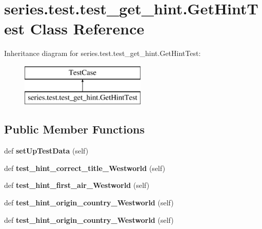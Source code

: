 \hypertarget{classseries_1_1test_1_1test__get__hint_1_1_get_hint_test}{}\section{series.\+test.\+test\+\_\+get\+\_\+hint.\+Get\+Hint\+Test Class Reference}
\label{classseries_1_1test_1_1test__get__hint_1_1_get_hint_test}
Inheritance diagram for series.\+test.\+test\+\_\+get\+\_\+hint.\+Get\+Hint\+Test\+:\begin{figure}[H]
\begin{center}
\leavevmode
\includegraphics[height=2.000000cm]{classseries_1_1test_1_1test__get__hint_1_1_get_hint_test}
\end{center}
\end{figure}
\subsection*{Public Member Functions}
\begin{DoxyCompactItemize}
\item 
\mbox{\label{classseries_1_1test_1_1test__get__hint_1_1_get_hint_test_a1ca4a29a8d5e929e3bd60038b5362a0e}} 
def {\bfseries set\+Up\+Test\+Data} (self)
\item 
\mbox{\label{classseries_1_1test_1_1test__get__hint_1_1_get_hint_test_a696a37015d3461cd1ac57cbe488dca9a}} 
def {\bfseries test\+\_\+hint\+\_\+correct\+\_\+title\+\_\+\+Westworld} (self)
\item 
\mbox{\label{classseries_1_1test_1_1test__get__hint_1_1_get_hint_test_aae5e51183d8e0aa3c1e2eb39bd9cc3b7}} 
def {\bfseries test\+\_\+hint\+\_\+first\+\_\+air\+\_\+\+Westworld} (self)
\item 
\mbox{\label{classseries_1_1test_1_1test__get__hint_1_1_get_hint_test_a3c394995df127c9675c6eb0356bb0a1e}} 
def {\bfseries test\+\_\+hint\+\_\+origin\+\_\+country\+\_\+\+Westworld} (self)
\item 
\mbox{\label{classseries_1_1test_1_1test__get__hint_1_1_get_hint_test_a3c394995df127c9675c6eb0356bb0a1e}} 
def {\bfseries test\+\_\+hint\+\_\+origin\+\_\+country\+\_\+\+Westworld} (self)
\end{DoxyCompactItemize}
